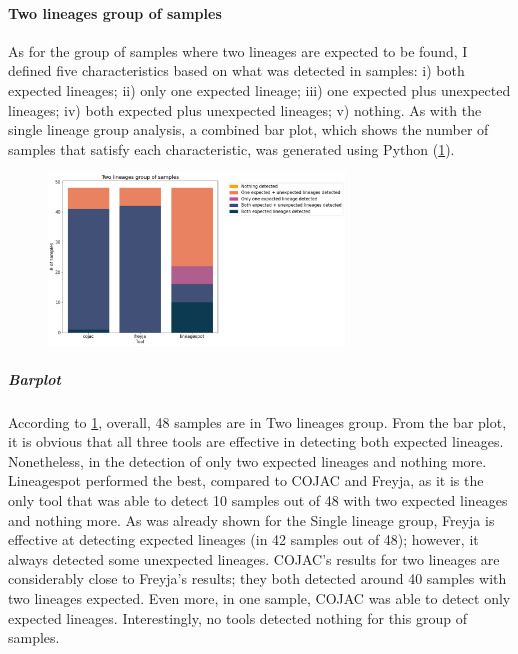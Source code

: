                 
            \paragraph{Two lineages group of samples}
            As for the group of samples where two lineages are expected to be found, I defined five characteristics based on what was detected in samples: i) both expected lineages; ii) only one expected lineage; iii) one expected plus unexpected lineages; iv) both expected plus unexpected lineages; v) nothing. As with the single lineage group analysis, a combined bar plot, which shows the number of samples that satisfy each characteristic, was generated using Python (\cref{fig:results:mock:bar-twolin}). 
            \begin{figure}[ht!]
                \centering
                \includegraphics[width=0.7\textwidth]{figures/results/mock/twolin-num-bars.png}
                \label{fig:results:mock:bar-twolin}
            \end{figure}
                \subparagraph{Barplot}
                According to \cref{fig:results:mock:bar-twolin}, overall, 48 samples are in Two lineages group. From the bar plot, it is obvious that all three tools are effective in detecting both expected lineages. Nonetheless, in the detection of only two expected lineages and nothing more. Lineagespot performed the best, compared to COJAC and Freyja, as it is the only tool that was able to detect 10 samples out of 48 with two expected lineages and nothing more. As was already shown for the Single lineage group, Freyja is effective at detecting expected lineages (in 42 samples out of 48); however, it always detected some unexpected lineages. COJAC's results for two lineages are considerably close to Freyja's results; they both detected around 40 samples with two lineages expected. Even more, in one sample, COJAC was able to detect only expected lineages. Interestingly, no tools detected nothing for this group of samples.

